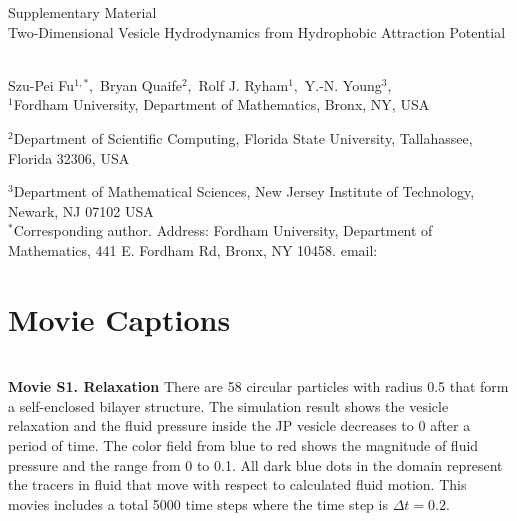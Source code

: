 
\thispagestyle{empty}

\newpage
{\Large \bf

  \noindent Supplementary Material\\

  \noindent 
  Two-Dimensional Vesicle Hydrodynamics from Hydrophobic Attraction Potential}\\

\noindent 
Szu-Pei Fu$^{1,*},$ 
Bryan Quaife$^{2},$ 
Rolf J. Ryham$^{1},$ 
Y.-N. Young$^{3},$
\\


\noindent
$^{1}$Fordham University, Department of Mathematics,  Bronx, NY, USA

\noindent
$^{2}$Department of Scientific Computing, Florida State University, Tallahassee, Florida 32306, USA

\noindent
$^{3}$Department of Mathematical Sciences, New Jersey Institute of Technology, Newark, NJ  07102 USA
\\

\noindent $^*$Corresponding author. Address: Fordham University, Department of Mathematics, 441 E. Fordham Rd, Bronx, NY 10458. email: 



\setcounter{page}{1}

\setcounter{figure}{0}
\renewcommand{\thefigure}{S\arabic{figure}}

\setcounter{equation}{0}
\renewcommand{\theequation}{S\arabic{equation}}

\setcounter{section}{0}
\renewcommand{\thesection}{S\arabic{section}}   





\sloppy
\section{Movie Captions}\mbox{} \\

\noindent
{\bf Movie S1. Relaxation} There are 58 circular particles with radius 0.5 that form a self-enclosed bilayer structure. The simulation result shows the vesicle relaxation and the fluid pressure inside the JP vesicle decreases to 0 after a period of time.
The color field from blue to red shows the magnitude of fluid pressure and the range from 0 to 0.1. All dark blue dots in the domain represent the tracers in fluid that move with respect to calculated fluid motion.
This movies includes a total 5000 time steps where the time step is $\Delta t=0.2$.\\



